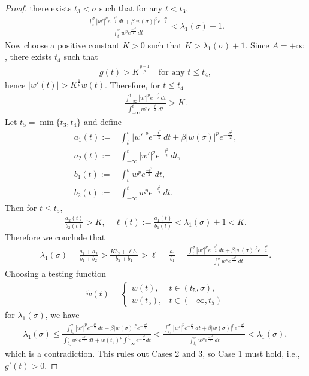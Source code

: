 \documentclass[10pt,a4paper]{amsart}
\def\l{\lambda}
\begin{document}
\begin{proof}
there exists $t_{3}<\sigma$ such that for any $t<t_{3}$,
\begin{align}
    \frac{ \int_{t}^{\sigma} |w'|^p e^{-\frac{t^2}{2}} \, dt + \beta |w(\sigma)|^p e^{-\frac{\sigma^2}{2}} }{\int_{t}^{\sigma} w^p e^{\frac{-t^2}{2}}\, dt}<\lambda_1(\sigma)+1.
\end{align}
Now choose a positive constant  $K>0$ such that $K>\lambda_1(\sigma)+1$. Since  $A=+\infty$, there exists    $t_{4}$ such that 
\begin{align*}
        g(t)>K^{\frac{p-1}{p}} \quad \text{for any $t\leq t_{4}$},
\end{align*}
 hence
 $|w'(t)|>K^{\frac{1}{p}}w(t)$. Therefore, for $t\le t_4$
\begin{align*}
    \frac{\int_{-\infty}^{t} |w'|^p e^{-\frac{t^2}{2}} \, dt}{\int_{-\infty}^{t} w^p e^{-\frac{t^2}{2}} \,dt} > K.
\end{align*}
Let  $t_5=\min\{t_3,t_4\}$ and define
\begin{align*}
    a_{1}(t):=&\int_{t}^{\sigma} |w'|^p e^{-\frac{t^2}{2}} \, dt + \beta |w(\sigma)|^p e^{-\frac{\sigma^2}{2}},\\
     a_{2}(t):=&\int_{-\infty}^{t} |w'|^p e^{-\frac{t^2}{2}} \, dt,\\
     b_{1}(t):=&\int_{t}^{\sigma} w^p e^{\frac{-t^2}{2}}\, dt,\\
     b_2(t):=&\int_{-\infty}^{t} w^p e^{-\frac{t^2}{2}} \, dt.
\end{align*}
Then for  $t\leq t_5$,
\begin{align*}
   \frac{a_2(t)}{b_2(t)} > K, \quad \ell (t):= \frac{a_1(t)}{b_1(t)}<\lambda_1(\sigma)+1<K. 
\end{align*}
Therefore we conclude that
\begin{align*}
\lambda_1(\sigma)=\frac{a_1 + a_2}{b_1 + b_2} > \frac{K b_2 + \ell b_1}{b_2 + b_1} > \ell = \frac{a_1}{b_1}=\frac{\int_{t}^{\sigma} |w'|^p e^{-\frac{t^2}{2}} \, dt + \beta |w(\sigma)|^p e^{-\frac{\sigma^2}{2}}}{\int_{t}^{\sigma} w^p e^{\frac{-t^2}{2}}\, dt}.
\end{align*}
Choosing a testing function 
\begin{align*}
    \widetilde{w}(t) = 
\begin{cases} 
w(t), & t \in (t_5, \sigma), \\
w(t_5), & t \in (-\infty, t_5)
\end{cases}
\end{align*}
for $\l_1(\sigma)$, we have 
\begin{align*}
    \lambda_1(\sigma)\leq \frac{\int_{t_5}^{\sigma} |w'|^p e^{-\frac{t^2}{2}} \, dt + \beta |w(\sigma)|^p e^{-\frac{\sigma^2}{2}}}{\int_{t_5}^{\sigma} w^p e^{\frac{-t^2}{2}}\, dt+w(t_{5})^p\int_{-\infty}^{t_{5}}e^{-\frac{t^{2}}{2}}dt}< \frac{\int_{t_5}^{\sigma} |w'|^p e^{-\frac{t^2}{2}} \, dt + \beta |w(\sigma)|^p e^{-\frac{\sigma^2}{2}}}{\int_{t_5}^{\sigma} w^p e^{\frac{-t^2}{2}}\, dt}<\lambda_1(\sigma),
\end{align*}
which is a contradiction. This rules out Cases 2 and 3, so Case 1 must hold, i.e.,
 $g'(t)>0$.
\end{proof}
\end{document}
